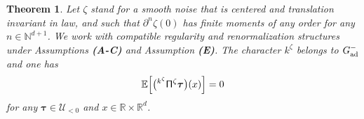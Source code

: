 \documentclass[10pt, reqno]{amsart}
\numberwithin{subsection}{section}
\numberwithin{subsubsection}{subsection}
\numberwithin{equation}{section} %
\theoremstyle{mystyle}
\newtheorem{thm}{Theorem}
\theoremstyle{mystyle2}
\theoremstyle{mystyle3}
\newcommand{\bstau}{\boldsymbol{\tau}}
\newcommand{\ssk}{\smallskip}
\newcommand\bbE{\mathbb{E}}
\newcommand\bbN{\mathbb{N}}
\newcommand\bbR{\mathbb{R}}
\newcommand\mcU{\mathcal U}
\begin{document}
\medskip

\begin{thm}   \label{ThmPropertyBPHZRenorm}
Let $\zeta$ stand for a smooth noise that is centered and translation invariant in law, and such that $\partial^n\zeta(0)$ has finite moments of any order for any $n\in\bbN^{d+1}$. We work with compatible regularity and renormalization structures under Assumptions \textbf{\textsf{(A-C)}} and Assumption \textbf{\textsf{(E)}}. The character $k^\zeta$ belongs to $G_{\text{\rm ad}}^-$ and one has
\begin{equation}   \label{EqStationaryModel}
\bbE\Big[\big( {}^{k^\zeta}{\sf \Pi}^\zeta\bstau\big)(x)\Big] = 0
\end{equation}
for any $\bstau\in \mcU_{<0}$ and $x\in\bbR\times\bbR^d$.
\end{thm}


\ssk
\end{document}
